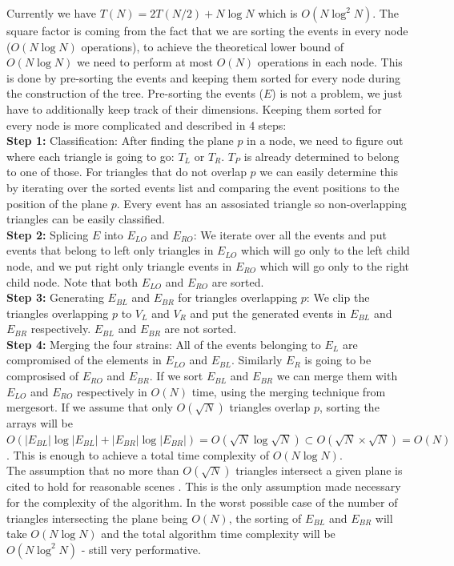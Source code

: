 \documentclass[12pt]{article}
\begin{document}
\indent Currently we have $T(N) = 2T(N/2) + N\log N$ which is $O(N\log^2N)$. The square factor is coming from the fact that we are sorting the events in every node ($O(N\log N)$ operations), to achieve the theoretical lower bound of $O(N\log N)$ we need to perform at most $O(N)$ operations in each node. This is done by pre-sorting the events and keeping them sorted for every node during the construction of the tree. Pre-sorting the events ($E$) is not a problem, we just have to additionally keep track of their dimensions. Keeping them sorted for every node is more complicated and described in 4 steps:\\
\indent \textbf{Step 1:} Classification: After finding the plane $p$ in a node, we need to figure out where each triangle is going to go: $T_L$ or $T_R$. $T_P$ is already determined to belong to one of those. For triangles that do not overlap $p$ we can easily determine this by iterating over the sorted events list and comparing the event positions to the position of the plane $p$. Every event has an assosiated triangle so non-overlapping triangles can be easily classified.\\
\indent \textbf{Step 2:} Splicing $E$ into $E_{LO}$ and $E_{RO}$: We iterate over all the events and put events that belong to left only triangles in $E_{LO}$ which will go only to the left child node, and we put right only triangle events in $E_{RO}$ which will go only to the right child node. Note that both $E_{LO}$ and $E_{RO}$ are sorted.\\
\indent \textbf{Step 3:} Generating $E_{BL}$ and $E_{BR}$ for triangles overlapping $p$: We clip the triangles overlapping $p$ to $V_L$ and $V_R$ and put the generated events in $E_{BL}$ and $E_{BR}$ respectively. $E_{BL}$ and $E_{BR}$ are not sorted.\\
\indent \textbf{Step 4:} Merging the four strains: All of the events belonging to $E_L$ are compromised of the elements in $E_{LO}$ and $E_{BL}$. Similarly $E_R$ is going to be comprosised of $E_{RO}$ and $E_{BR}$. If we sort $E_{BL}$ and $E_{BR}$ we can merge them with $E_{LO}$ and $E_{RO}$ respectively in $O(N)$ time, using the merging technique from mergesort. If we assume that only $O(\sqrt{N})$ triangles overlap $p$, sorting the arrays will be $O(|E_{BL}|\log |E_{BL}| + |E_{BR}|\log |E_{BR}|) = O(\sqrt{N}\log \sqrt{N})\subset O(\sqrt{N}\times \sqrt{N}) = O(N)$. This is enough to achieve a total time complexity of $O(N\log N)$.\\
\indent The assumption that no more than $O(\sqrt{N})$ triangles intersect a given plane is cited to hold for reasonable scenes \cite{de2002realistic}. This is the only assumption made necessary for the complexity of the algorithm. In the worst possible case of the number of triangles intersecting the plane being $O(N)$, the sorting of $E_{BL}$ and $E_{BR}$ will take $O(N\log N)$ and the total algorithm time complexity will be $O(N\log^2N)$ - still very performative.\\
\end{document}
